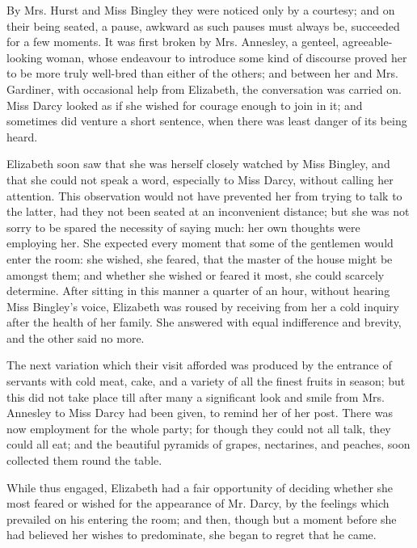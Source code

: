 By Mrs. Hurst and Miss Bingley they were noticed only by a courtesy; and on their being seated, a pause, awkward as such pauses must always be, succeeded for a few moments. It was first broken by Mrs. Annesley, a genteel, agreeable-looking woman, whose endeavour to introduce some kind of discourse proved her to be more truly well-bred than either of the others; and between her and Mrs. Gardiner, with occasional help from Elizabeth, the conversation was carried on. Miss Darcy looked as if she wished for courage enough to join in it; and sometimes did venture a short sentence, when there was least danger of its being heard.

Elizabeth soon saw that she was herself closely watched by Miss Bingley, and that she could not speak a word, especially to Miss Darcy, without calling her attention. This observation would not have prevented her from trying to talk to the latter, had they not been seated at an inconvenient distance; but she was not sorry to be spared the necessity of saying much: her own thoughts were employing her. She expected every moment that some of the gentlemen would enter the room: she wished, she feared, that the master of the house might be amongst them; and whether she wished or feared it most, she could scarcely determine. After sitting in this manner a quarter of an hour, without hearing Miss Bingley's voice, Elizabeth was roused by receiving from her a cold inquiry after the health of her family. She answered with equal indifference and brevity, and the other said no more.

The next variation which their visit afforded was produced by the entrance of servants with cold meat, cake, and a variety of all the finest fruits in season; but this did not take place till after many a significant look and smile from Mrs. Annesley to Miss Darcy had been given, to remind her of her post. There was now employment for the whole party; for though they could not all talk, they could all eat; and the beautiful pyramids of grapes, nectarines, and peaches, soon collected them round the table.

While thus engaged, Elizabeth had a fair opportunity of deciding whether she most feared or wished for the appearance of Mr. Darcy, by the feelings which prevailed on his entering the room; and then, though but a moment before she had believed her wishes to predominate, she began to regret that he came.

